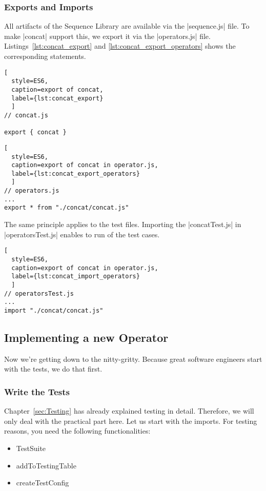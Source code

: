 \subsubsection{Exports and Imports}
All artifacts of the Sequence Library are available via the |sequence.js| file.
To make |concat| support this, we export it via the |operators.js| file.
Listings~\ref{lst:concat_export} and \ref{lst:concat_export_operators} shows the corresponding statements.

\begin{lstlisting}[
  style=ES6, 
  caption=export of concat,
  label={lst:concat_export}
  ]
// concat.js

export { concat }
\end{lstlisting}



\begin{lstlisting}[
  style=ES6, 
  caption=export of concat in operator.js,
  label={lst:concat_export_operators}
  ]
// operators.js
...
export * from "./concat/concat.js"
\end{lstlisting}

The same principle applies to the test files. Importing the |concatTest.js| in
|operatorsTest.js| enables to run of the test cases.

\begin{lstlisting}[
  style=ES6, 
  caption=export of concat in operator.js,
  label={lst:concat_import_operators}
  ]
// operatorsTest.js
...
import "./concat/concat.js"
\end{lstlisting}

\subsection{Implementing a new Operator}
\label{subsub:Implementing a new Operator}
Now we're getting down to the nitty-gritty.
Because great software engineers start with the tests, we do that first.

\subsubsection{Write the Tests}
\label{subsub:Write the Tests}
Chapter~\ref{sec:Testing} has already explained testing in detail. Therefore, we will only deal 
with the practical part here.
\newline
Let us start with the imports. For testing reasons, you need the following
functionalities:

\begin{itemize}
  \item{TestSuite}
  \item{addToTestingTable}
  \item{createTestConfig}
\end{itemize}

